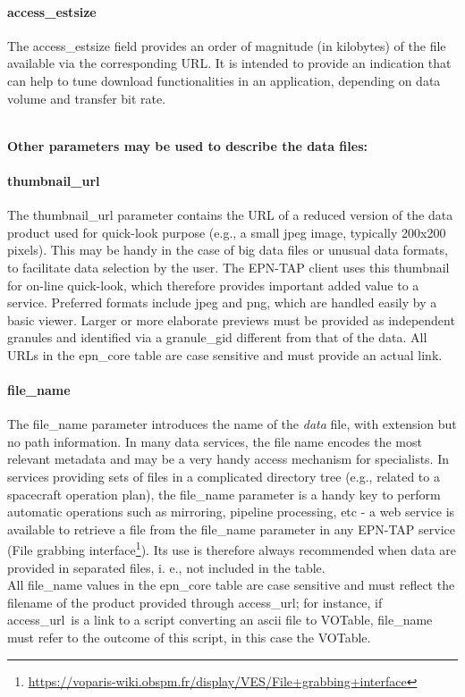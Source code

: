 \documentclass[11pt,a4paper]{ivoa}
\begin{document}
\paragraph{access\_estsize}

The access\_estsize field provides an order of magnitude (in kilobytes) of the file available via the corresponding URL. It is intended to provide an indication that can help to tune download functionalities in an application, depending on data volume and transfer bit rate.

\\

\textbf{Other parameters may be used to describe the data files:}

\paragraph{thumbnail\_url}

The thumbnail\_url parameter contains the URL of a reduced version of the data product used for quick-look purpose (e.g., a small jpeg image, typically 200x200 pixels). This may be handy in the case of big data files or unusual data formats, to facilitate data selection by the user. The EPN-TAP client uses this thumbnail for on-line quick-look, which therefore provides important added value to a service. Preferred formats include jpeg and png, which are handled easily by a basic viewer. Larger or more elaborate previews must be provided as independent granules and identified via a granule\_gid different from that of the data. All URLs in the epn\_core table are case sensitive and must provide an actual link.

\paragraph{file\_name}

The file\_name parameter introduces the name of the \emph{data} file, with extension but no path information. In many data services, the file name encodes the most relevant metadata and may be a very handy access mechanism for specialists. In services providing sets of files in a complicated directory tree (e.g., related to a spacecraft operation plan), the file\_name parameter is a handy key to perform automatic operations such as mirroring, pipeline processing, etc - a web service is available to retrieve a file from the file\_name parameter in any EPN-TAP service (File grabbing interface\footnote{\url{https://voparis-wiki.obspm.fr/display/VES/File+grabbing+interface}}). Its use is therefore always recommended when data are provided in separated files, i. e., not included in the table.\\All file\_name values in the epn\_core table are case sensitive and must reflect the filename of the product provided through access\_url; for instance, if access\_url is a link to a script converting an ascii file to VOTable, file\_name must refer to the outcome of this script, in this case the VOTable.
\end{document}
